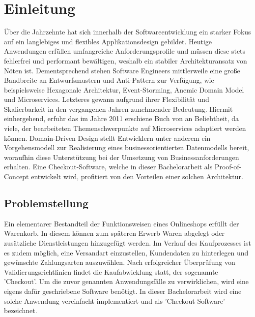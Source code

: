 

\chapter{Einleitung}

Über die Jahrzehnte hat sich innerhalb der Softwareentwicklung ein starker Fokus auf ein langlebiges und flexibles Applikationsdesign gebildet. Heutige Anwendungen erfüllen umfangreiche Anforderungsprofile und müssen diese stets fehlerfrei und performant bewältigen, weshalb ein stabiler Architekturansatz von Nöten ist. Dementsprechend stehen Software Engineers mittlerweile eine große Bandbreite an Entwurfsmustern und Anti-Pattern zur Verfügung, wie beispielsweise Hexagonale Architektur, Event-Storming, Anemic Domain Model und Microservices. Letzteres gewann aufgrund ihrer Flexibilität und Skalierbarkeit in den vergangenen Jahren zunehmender Bedeutung. Hiermit einhergehend, erfuhr das im Jahre 2011 erschiene Buch  von \citeauthor{Evans.2011} an Beliebtheit, da viele, der bearbeiteten Themenschwerpunkte auf Microservices adaptiert werden können. Domain-Driven Design stellt Entwicklern unter anderem ein Vorgehensmodell zur Realisierung eines businessorientierten Datenmodells bereit, woraufhin diese Unterstützung bei der Umsetzung von Businessanforderungen erhalten. Eine Checkout-Software, welche in dieser Bachelorarbeit als Proof-of-Concept entwickelt wird, profitiert von den Vorteilen einer solchen Architektur.


\section{Problemstellung}

Ein elementarer Bestandteil der Funktionsweisen eines Onlineshops erfüllt der Warenkorb. In diesem können zum späteren Erwerb Waren abgelegt oder zusätzliche Dienstleistungen hinzugefügt werden. Im Verlauf des Kaufprozesses ist es zudem möglich, eine Versandart einzustellen, Kundendaten zu hinterlegen und gewünschte Zahlungsarten auszuwählen. Nach erfolgreicher Überprüfung von Validierungsrichtlinien findet die Kaufabwicklung statt, der sogenannte 'Checkout'. Um die zuvor genannten Anwendungsfälle zu verwirklichen, wird eine eigens dafür geschriebene Software benötigt. In dieser Bachelorarbeit wird eine solche Anwendung vereinfacht implementiert und als 'Checkout-Software' bezeichnet.

